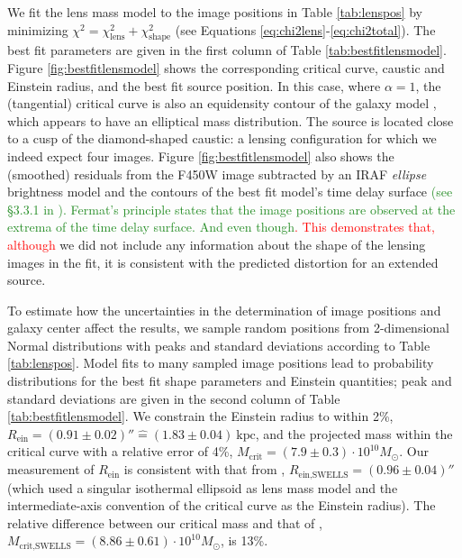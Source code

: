\documentclass[useAMS,usenatbib]{mnras}
\newcommand{\NEW}[1]{\textcolor{ForestGreen}{#1}}
\newcommand{\OLD}[1]{\textcolor{Red}{#1}}
\begin{document}
We fit the lens mass model to the image positions in Table \ref{tab:lenspos} by minimizing $\chi^2 = \chi_\text{lens}^2 + \chi_\text{shape}^2$ (see Equations \eqref{eq:chi2lens}-\eqref{eq:chi2total}). The best fit parameters are given in the first column of Table \ref{tab:bestfitlensmodel}. Figure \ref{fig:bestfitlensmodel} shows the corresponding critical curve, caustic and Einstein radius, and the best fit source position. In this case, where $\alpha=1$, the (tangential) critical curve is also an equidensity contour of the galaxy model \citep{EvansWitt}, which appears to have an elliptical mass distribution. The source is located close to a cusp of the diamond-shaped caustic: a lensing configuration for which we indeed expect four images. Figure \ref{fig:bestfitlensmodel} also shows the (smoothed) residuals from the F450W image subtracted by an IRAF \emph{ellipse} brightness model and the contours of the best fit model's time delay surface \NEW{(see \S 3.3.1 in \citet{1996astro.ph..6001N}).  Fermat's principle states that the image positions are observed at the extrema of the time delay surface. And even though}\OLD{. This demonstrates that, although} we did not include any information about the shape of the lensing images in the fit, it is consistent with the predicted distortion for an extended source.

To estimate how the uncertainties in the determination of image positions and galaxy center affect the results, we sample random positions from 2-dimensional Normal distributions with peaks and standard deviations according to Table \ref{tab:lenspos}. Model fits to many sampled image positions lead to probability distributions for the best fit shape parameters and Einstein quantities; peak and standard deviations are given in the second column of Table \ref{tab:bestfitlensmodel}. We constrain the Einstein radius to within 2\%, $R_\text{ein} = (0.91 \pm 0.02)'' \hat{=}(1.83\pm0.04)~\text{kpc}$, and the projected mass within the critical curve with a relative error of 4\%, $M_\text{crit} =(7.9\pm0.3)\cdot 10^{10} M_\odot$. Our measurement of $R_\text{ein}$ is consistent with that from \citet{SWELLSIII}, $R_\text{ein,SWELLS} = (0.96 \pm 0.04)''$ (which used a singular isothermal ellipsoid as lens mass model and the intermediate-axis convention of the critical curve as the Einstein radius). The relative difference between our critical mass and that of \citet{SWELLSIII}, $M_\text{crit,SWELLS} =(8.86\pm0.61)\cdot 10^{10} M_\odot$, is 13\%.
\end{document}
